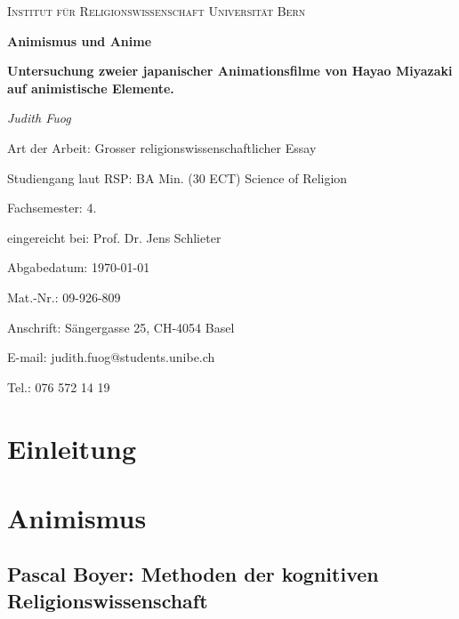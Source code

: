 \documentclass[a4paper]{article}
\begin{document}
\begin{titlepage}
	\begin{center}
	{\scshape\LARGE Institut für Religionswissenschaft Universität Bern \par}
	\vspace{1cm}
	{\huge\bfseries Animismus und Anime\par}
	\vspace{.5cm}
	{\large\bfseries Untersuchung zweier japanischer Animationsfilme von Hayao Miyazaki auf animistische Elemente.\par}
	\vspace{2cm}
	{\Large\itshape Judith Fuog\par}
	\vfill
	\end{center}

\begin{minipage}{\textwidth}
	\begin{large}
	Art der Arbeit: Grosser religionswissenschaftlicher Essay\par
	Studiengang laut RSP: BA Min. (30 ECT) Science of Religion\par
	Fachsemester: 4.\par
	\hfill

	eingereicht bei: Prof. Dr. Jens Schlieter\par
	Abgabedatum: \today\par
	\hfill

	Mat.-Nr.: 09-926-809\par
	Anschrift: Sängergasse 25, CH-4054 Basel\par
	E-mail: judith.fuog@students.unibe.ch\par
	Tel.: 076 572 14 19\par
	\end{large}
\end{minipage}
\hfill
\end{titlepage}
\newpage
\tableofcontents
\newpage

\section*{Einleitung}

\newpage

\section{Animismus}

\subsection{Pascal Boyer: Methoden der kognitiven Religionswissenschaft}

\newpage
\end{document}
